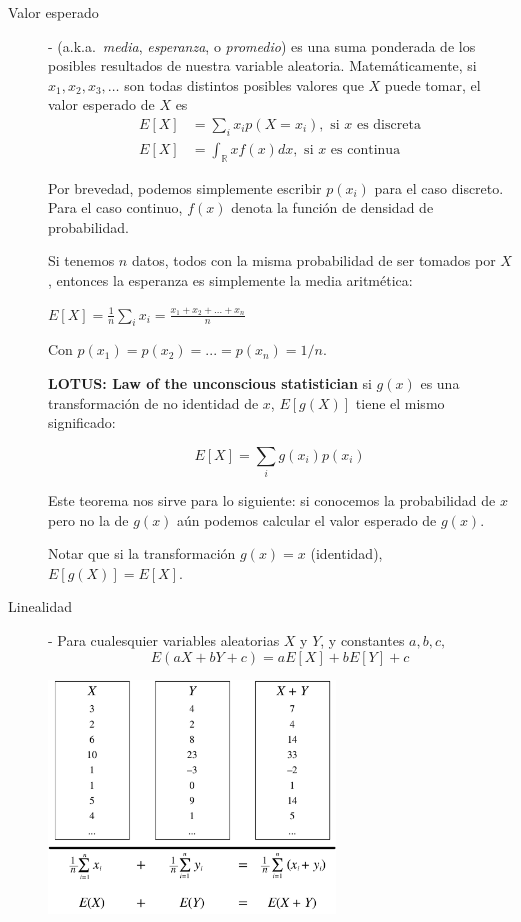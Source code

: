 \documentclass[12pt]{scrartcl}
\theoremstyle{definition}
\begin{document}
\begin{description}
	\item[Valor esperado] - (a.k.a.~\emph{media}, \emph{esperanza}, o \emph{promedio}) es una suma ponderada de los posibles resultados de nuestra variable aleatoria. Matemáticamente, si $x_1, x_2, x_3, \dots$ son todas distintos posibles valores que $X$ puede tomar, el valor esperado de $X$ es
	\begin{align*}
		E[X] &= \sum\limits_{i}x_i p(X=x_i), \text{ si $x$ es discreta}\\
		E[X] &= \int_\mathbb{R} xf(x)dx, \text{ si $x$ es continua}
	\end{align*}
	
	Por brevedad, podemos simplemente escribir $p(x_i)$ para el caso discreto. Para el caso continuo, $f(x)$ denota la función de densidad de probabilidad.
	
	Si tenemos $n$ datos, todos con la misma probabilidad de ser tomados por $X$, entonces la esperanza es simplemente la media aritmética:
	
	\begin{center}
		$E[X] = \frac{1}{n}\sum\limits_{i}x_i = \frac{x_1 + x_2 + \dots + x_n}{n}$
	\end{center}
	
	Con $p(x_1)=p(x_2)=...=p(x_n)=1/n$.

    \textbf{LOTUS: Law of the unconscious statistician} si $ g(x) $ es una transformación de no identidad de $ x $, $ E[g(X)] $ tiene el mismo significado:


    \[
        E[X] = \sum\limits_{i} g(x_i) p(x_i)
    \]

    Este teorema nos sirve para lo siguiente: si conocemos la probabilidad de $ x $ pero no la de $ g(x) $ aún podemos calcular el valor esperado de $ g(x) $. 
    
    Notar que si la transformación $ g(x) = x $ (identidad), $ E[g(X)] = E[X] $. 

	\item[Linealidad] - Para cualesquier variables aleatorias $X$ y $Y$, y constantes $a,b,c,$ 
	\[E(aX + bY + c) = aE[X] + bE[Y] + c \]
	
	\begin{minipage}{\linewidth}
		\centering
		\includegraphics[width=3in]{figs/linearity.pdf}
	\end{minipage}
	

\end{description}
\end{document}
